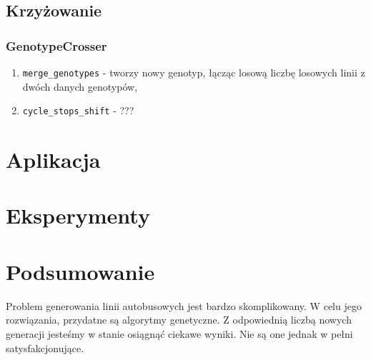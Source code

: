 \documentclass[12pt,a4paper,openright]{mwrep}
\begin{document}
\section{Krzyżowanie}
\subsection{GenotypeCrosser}

\begin{enumerate}
    \item \lstinline{merge_genotypes} - tworzy nowy genotyp, łącząc losową liczbę losowych linii z dwóch danych genotypów,
    \item \lstinline{cycle_stops_shift} - ???
\end{enumerate}

\chapter{Aplikacja}

\chapter{Eksperymenty}

\chapter{Podsumowanie}

Problem generowania linii autobusowych jest bardzo skomplikowany. W celu jego rozwiązania, przydatne są algorytmy genetyczne. Z odpowiednią liczbą nowych generacji jesteśmy w stanie osiągnąć ciekawe wyniki. Nie są one jednak w pełni satysfakcjonujące.
\end{document}
